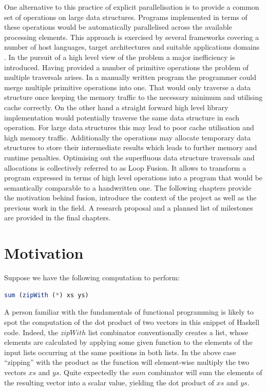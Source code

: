\documentclass[preamble.tex]{subfiles}
\begin{document}
One alternative to this practice of explicit parallelisation is to provide a common set of operations on large data structures. Programs implemented in terms of these operations would be automatically parallelised across the available processing elements. This approach is exercised by several frameworks covering a number of host languages, target architectures and suitable applications domains \cite{PLKC08,KCL+10,CKL+11,AS07}. In the pursuit of a high level view of the problem a major inefficiency is introduced. Having provided a number of primitive operations the problem of multiple traversals arises. In a manually written program the programmer could merge multiple primitive operations into one. That would only traverse a data structure once keeping the memory traffic to the necessary minimum and utilising cache correctly. On the other hand a straight forward high level library implementation would potentially traverse the same data structure in each operation. For large data structures this may lead to poor cache utilisation and high memory traffic. Additionally the operations may allocate temporary data structures to store their intermediate results which leads to further memory and runtime penalties. Optimising out the superfluous data structure traversals and allocations is collectively referred to as Loop Fusion. It allows to transform a program expressed in terms of high level operations into a program that would be semantically comparable to a handwritten one. The following chapters provide the motivation behind fusion, introduce the context of the project as well as the previous work in the field. A research proposal and a planned list of milestones are provided in the final chapters.


\pagebreak
\chapter{Motivation}

Suppose we have the following computation to perform:

\begin{lstlisting}[basicstyle={\ttfamily},language=Haskell,tabsize=4]
sum (zipWith (*) xs ys)
\end{lstlisting}


A person familiar with the fundamentals of functional programming is likely to spot the computation of the dot product of two vectors in this snippet of Haskell code. Indeed, the $zipWith$ list combinator conventionally creates a list, whose elements are calculated by applying some given function to the elements of the input lists occurring at the same positions in both lists. In the above case {}``zipping'' with the product as the function will element-wise multiply the two vectors $xs$ and $ys$. Quite expectedly the $sum$ combinator will sum the elements of the resulting vector into a scalar value, yielding the dot product of $xs$ and $ys$.
\end{document}
